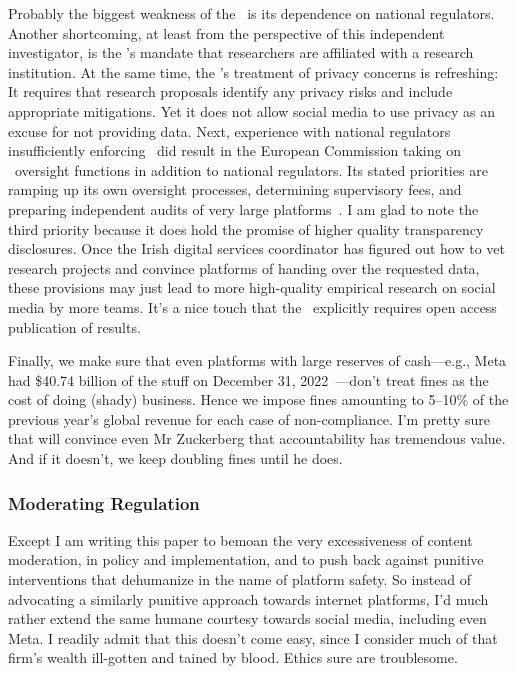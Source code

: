 Probably the biggest weakness of the \DSA\ is its dependence on national
regulators. Another shortcoming, at least from the perspective of this
independent investigator, is the \DSA's mandate that researchers are affiliated
with a research institution. At the same time, the \DSA's treatment of privacy
concerns is refreshing: It requires that research proposals identify any privacy
risks and include appropriate mitigations. Yet it does not allow social media to
use privacy as an excuse for not providing data. Next, experience with national
regulators insufficiently enforcing \GDPR\ did result in the European Commission
taking on \DSA\ oversight functions in addition to national regulators. Its
stated priorities are ramping up its own oversight processes, determining
supervisory fees, and preparing independent audits of very large
platforms~\cite{Bertuzzi2022,TenThije2022}. I am glad to note the third priority
because it does hold the promise of higher quality transparency disclosures.
Once the Irish digital services coordinator has figured out how to vet research
projects and convince platforms of handing over the requested data, these
provisions may just lead to more high-quality empirical research on social media
by more teams. It's a nice touch that the \DSA\ explicitly requires open access
publication of results.

Finally, we make sure that even platforms with large reserves of cash---e.g.,
Meta had \$40.74 billion of the stuff on December 31,
2022~\cite{MetaPlatforms2023}---don't treat fines as the cost of doing (shady)
business. Hence we impose fines amounting to 5--10\% of the previous year's
global revenue for each case of non-compliance. I'm pretty sure that will
convince even Mr Zuckerberg that accountability has tremendous value. And if it
doesn't, we keep doubling fines until he does.


\subsubsection{Moderating Regulation}

Except I am writing this paper to bemoan the very excessiveness of content
moderation, in policy and implementation, and to push back against punitive
interventions that dehumanize in the name of platform safety. So instead of
advocating a similarly punitive approach towards internet platforms, I'd much
rather extend the same humane courtesy towards social media, including even
Meta. I readily admit that this doesn't come easy, since I consider much of that
firm's wealth ill-gotten and tained by blood. Ethics sure are troublesome.

